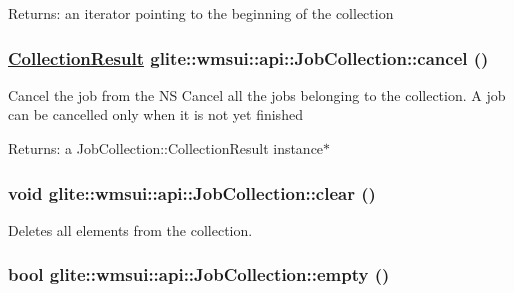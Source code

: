 \begin{Desc}
\item[Returns:]an iterator pointing to the beginning of the collection \end{Desc}
\hypertarget{classglite_1_1wmsui_1_1api_1_1JobCollection_z7_1}{
\subsubsection[cancel]{\setlength{\rightskip}{0pt plus 5cm}\hyperlink{structglite_1_1wmsui_1_1api_1_1CollectionResult}{Collection\-Result} glite::wmsui::api::Job\-Collection::cancel ()}}
\label{classglite_1_1wmsui_1_1api_1_1JobCollection_z7_1}


Cancel the job from the NS Cancel all the jobs belonging to the collection. A job can be cancelled only when it is not yet finished \begin{Desc}
\item[Returns:]a Job\-Collection::Collection\-Result instance$\ast$ \end{Desc}
\hypertarget{classglite_1_1wmsui_1_1api_1_1JobCollection_z3_4}{
\subsubsection[clear]{\setlength{\rightskip}{0pt plus 5cm}void glite::wmsui::api::Job\-Collection::clear ()}}
\label{classglite_1_1wmsui_1_1api_1_1JobCollection_z3_4}


Deletes all elements from the collection. \hypertarget{classglite_1_1wmsui_1_1api_1_1JobCollection_z3_0}{
\subsubsection[empty]{\setlength{\rightskip}{0pt plus 5cm}bool glite::wmsui::api::Job\-Collection::empty ()}}
\label{classglite_1_1wmsui_1_1api_1_1JobCollection_z3_0}


